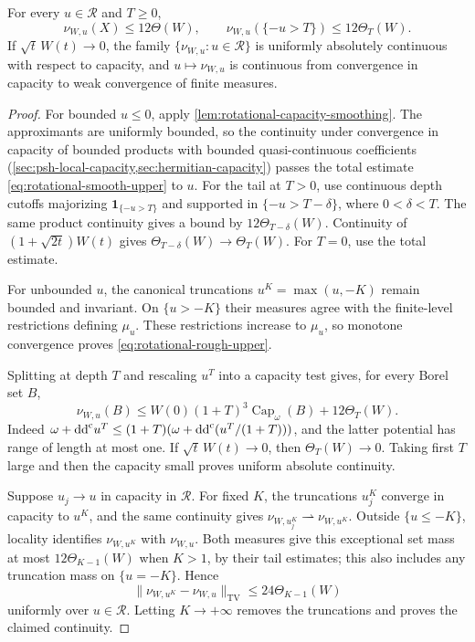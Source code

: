 \begin{proposition}\label{prop:rotational-weighted-upper}
For every $u\in\mathcal R$ and $T\geq0$,
\begin{equation}\label{eq:rotational-rough-upper}
 \nu_{W,u}(X)\leq12\Theta(W),\qquad
 \nu_{W,u}(\{-u>T\})\leq12\Theta_T(W).
\end{equation}
If $\sqrt t\,W(t)\to0$, the family $\{\nu_{W,u}:u\in\mathcal R\}$ is uniformly absolutely continuous with respect to capacity, and $u\mapsto\nu_{W,u}$ is continuous from convergence in capacity to weak convergence of finite measures.
\end{proposition}
\begin{proof}
For bounded $u\leq0$, apply \cref{lem:rotational-capacity-smoothing}. The approximants are uniformly bounded, so the continuity under convergence in capacity of bounded products with bounded quasi-continuous coefficients (\cref{sec:psh-local-capacity,sec:hermitian-capacity}) passes the total estimate \eqref{eq:rotational-smooth-upper} to $u$. For the tail at $T>0$, use continuous depth cutoffs majorizing $\mathbf1_{\{-u>T\}}$ and supported in $\{-u>T-\delta\}$, where $0<\delta<T$. The same product continuity gives a bound by $12\Theta_{T-\delta}(W)$. Continuity of $(1+\sqrt{2t})W(t)$ gives $\Theta_{T-\delta}(W)\to \Theta_T(W)$. For $T=0$, use the total estimate.

For unbounded $u$, the canonical truncations $u^K=\max(u,-K)$ remain bounded and invariant. On $\{u>-K\}$ their measures agree with the finite-level restrictions defining $\mu_u$. These restrictions increase to $\mu_u$, so monotone convergence proves \eqref{eq:rotational-rough-upper}.

Splitting at depth $T$ and rescaling $u^T$ into a capacity test gives, for every Borel set $B$,
\begin{equation}\label{eq:rotational-uniform-ac}
 \nu_{W,u}(B)\leq W(0)(1+T)^3\operatorname{Cap}_\omega(B)+12\Theta_T(W).
\end{equation}
Indeed $\omega+\mathrm{dd}^{\mathrm{c}} u^T\leq(1+T)(\omega+\mathrm{dd}^{\mathrm{c}}(u^T/(1+T)))$, and the latter potential has range of length at most one. If $\sqrt t\,W(t)\to0$, then $\Theta_T(W)\to0$. Taking first $T$ large and then the capacity small proves uniform absolute continuity.

Suppose $u_j\to u$ in capacity in $\mathcal R$. For fixed $K$, the truncations $u_j^K$ converge in capacity to $u^K$, and the same continuity gives $\nu_{W,u_j^K}\rightharpoonup\nu_{W,u^K}$. Outside $\{u\leq-K\}$, locality identifies $\nu_{W,u^K}$ with $\nu_{W,u}$. Both measures give this exceptional set mass at most $12\Theta_{K-1}(W)$ when $K>1$, by their tail estimates; this also includes any truncation mass on $\{u=-K\}$. Hence
\[
 \|\nu_{W,u^K}-\nu_{W,u}\|_{\mathrm{TV}}\leq24\Theta_{K-1}(W)
\]
uniformly over $u\in\mathcal R$. Letting $K\to+\infty$ removes the truncations and proves the claimed continuity.
\end{proof}

